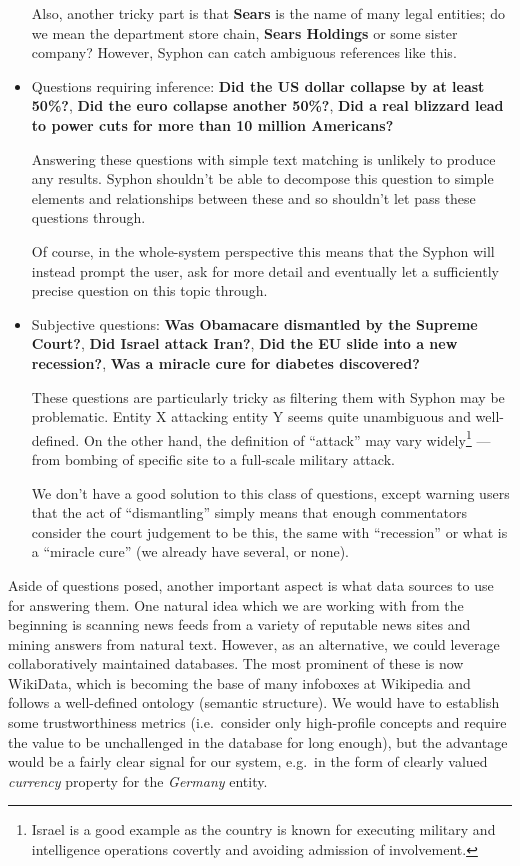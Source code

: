 \documentclass[11pt,a4paper]{article}
\begin{document}
\begin{itemize}
		Also, another tricky part is that \textbf{Sears} is the name
		of many legal entities; do we mean the department store
		chain, \textbf{Sears Holdings} or some sister company?
		However, Syphon can catch ambiguous references like this.

	\item Questions requiring inference: \textbf{Did the US dollar collapse by at least 50\%?},
		\textbf{Did the euro collapse another 50\%?},
		\textbf{Did a real blizzard lead to power cuts for more than 10 million Americans?}

		Answering these questions with simple text matching
		is unlikely to produce any results.  Syphon shouldn't
		be able to decompose this question to simple elements
		and relationships between these and so shouldn't let
		pass these questions through.

		Of course, in the whole-system perspective this means
		that the Syphon will instead
		prompt the user, ask for more detail and
		eventually let a sufficiently precise question on this topic through.

	\item Subjective questions: \textbf{Was Obamacare dismantled by the Supreme Court?},
		\textbf{Did Israel attack Iran?},
		\textbf{Did the EU slide into a new recession?},
		\textbf{Was a miracle cure for diabetes discovered?}

		These questions are particularly tricky as filtering
		them with Syphon may be problematic.  Entity X attacking
		entity Y seems quite unambiguous and well-defined.
		On the other hand, the definition of ``attack'' may
		vary widely\footnote{Israel is a good example as the country is known for executing military and intelligence operations covertly and avoiding admission of involvement.} --- from bombing of specific site
		to a full-scale military attack.

		We don't have a good solution to this class of questions,
		except warning users that the act of ``dismantling''
		simply means that enough commentators consider the court
		judgement to be this, the same with ``recession'' or what
		is a ``miracle cure'' (we already have several, or none).
\end{itemize}

Aside of questions posed, another important aspect is what data sources
to use for answering them.  One natural idea which we are working
with from the beginning is scanning news feeds from a variety of reputable
news sites and mining answers from natural text.
However, as an alternative, we could leverage collaboratively maintained
databases.  The most prominent of these is now WikiData, which is becoming the
base of many infoboxes at Wikipedia and follows a well-defined ontology (semantic structure).
We would have to establish some trustworthiness metrics (i.e.\ consider
only high-profile concepts and require the value to be unchallenged in
the database for long enough), but the advantage would be a fairly clear
signal for our system, e.g.\ in the form of clearly valued \textit{currency}
property for the \textit{Germany} entity.
\end{document}

